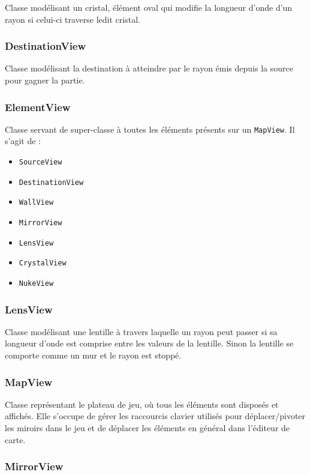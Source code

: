 \documentclass[]{article}
\begin{document}
Classe modélisant un cristal, élément oval qui modifie la longueur d’onde d’un rayon si celui-ci traverse ledit cristal.

\subsubsection{DestinationView}

Classe modélisant la destination à atteindre par le rayon émis depuis la source pour gagner la partie.

\subsubsection{ElementView}

Classe servant de super-classe à toutes les éléments présents sur un \texttt{MapView}.
Il s'agit de :

\begin{itemize}
    \item \texttt{SourceView}
    \item \texttt{DestinationView}
    \item \texttt{WallView}
    \item \texttt{MirrorView}
    \item \texttt{LensView}
    \item \texttt{CrystalView}
    \item \texttt{NukeView}
\end{itemize}

\subsubsection{LensView}

Classe modélisant une lentille à travers laquelle un rayon peut passer si sa longueur d’onde est
comprise entre les valeurs de la lentille. Sinon la lentille se comporte comme un mur et le rayon 
est stoppé.

\subsubsection{MapView}

Classe représentant le plateau de jeu, où tous les éléments sont disposés et affichés.
Elle s’occupe de gérer les raccourcis clavier utilisés pour déplacer/pivoter les miroirs dans le jeu et de déplacer les éléments en général dans l’éditeur de carte.

\subsubsection{MirrorView}
\end{document}
